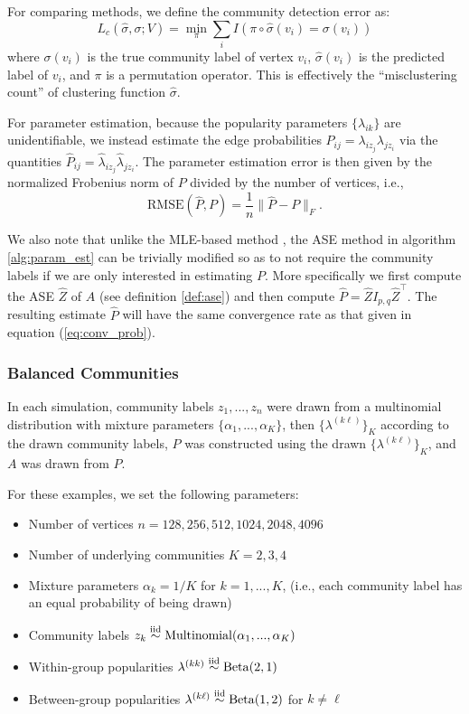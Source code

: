 \documentclass[
  11pt,
]{article}
\providecommand{\tightlist}{%
  \setlength{\itemsep}{0pt}\setlength{\parskip}{0pt}}
\theoremstyle{definition}
\theoremstyle{definition}
\theoremstyle{definition}
\theoremstyle{definition}
\theoremstyle{remark}
\begin{document}
For comparing methods, we define the community detection error as:
\[L_c(\hat{\sigma}, \sigma; V) = \min_\pi \sum_i I(\pi \circ \hat{\sigma}(v_i) = \sigma(v_i))\]
where \(\sigma(v_i)\) is the true community label of vertex \(v_i\), \(\hat{\sigma}(v_i)\) is the predicted label of \(v_i\), and \(\pi\) is a permutation operator.
This is effectively the ``misclustering count'' of clustering function \(\hat{\sigma}\).

For parameter estimation, because the popularity parameters \(\{\lambda_{ik}\}\) are unidentifiable, we instead estimate the edge probabilities \(P_{ij} = \lambda_{i z_j} \lambda_{j z_i}\) via the quantities \(\hat{P}_{ij} = \hat{\lambda}_{iz_j} \hat{\lambda}_{jz_i}\).
The parameter estimation error is then given by the normalized Frobenius norm of \(P\) divided by the number of vertices, i.e.,
\[\mathrm{RMSE}(\hat{P}, P) = \frac{1}{n} \|\hat{P} - P\|_F.\]

We also note that unlike the MLE-based method \citep{307cbeb9b1be48299388437423d94bf1}, the ASE method in algorithm \ref{alg:param_est} can be trivially modified so as to not require the community labels if we are only interested in estimating \(P\).
More specifically we first compute the ASE \(\hat{Z}\) of \(A\) (see definition \ref{def:ase}) and then compute \(\hat{P} = \hat{Z} I_{p,q} \hat{Z}^{\top}\).
The resulting estimate \(\hat{P}\) will have the same convergence rate as that given in equation (\ref{eq:conv_prob}).

\hypertarget{sec:balanced-communities}{%
\subsubsection{Balanced Communities}\label{sec:balanced-communities}}

In each simulation, community labels \(z_1, ..., z_n\) were drawn from a
multinomial distribution with mixture parameters
\(\{\alpha_1, ..., \alpha_K\}\), then \(\{\lambda^{(k \ell)}\}_K\) according
to the drawn community labels, \(P\) was constructed using the drawn
\(\{\lambda^{(k \ell)}\}_K\), and \(A\) was drawn from \(P\).

For these examples, we set the following parameters:

\begin{itemize}
\tightlist
\item
  Number of vertices \(n = 128, 256, 512, 1024, 2048, 4096\)
\item
  Number of underlying communities \(K = 2, 3, 4\)
\item
  Mixture parameters \(\alpha_k = 1 / K\) for \(k = 1, ..., K\), (i.e.,
  each community label has an equal probability of being drawn)
\item
  Community labels
  \(z_k \stackrel{\text{iid}}{\sim} \mathrm{Multinomial}(\alpha_1, ..., \alpha_K)\)
\item
  Within-group popularities
  \(\lambda^{(kk)} \stackrel{\text{iid}}{\sim} \mathrm{Beta}(2, 1)\)
\item
  Between-group popularities
  \(\lambda^{(k \ell)} \stackrel{\text{iid}}{\sim} \mathrm{Beta}(1, 2)\) for
  \(k \neq \ell\)
\end{itemize}
\end{document}
